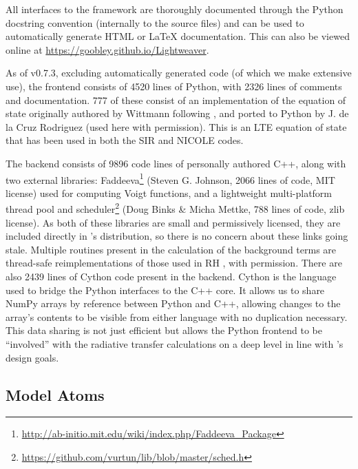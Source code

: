 All interfaces to the framework are thoroughly documented through the Python docstring convention (internally to the source files) and can be used to automatically generate HTML or \LaTeX{} documentation.
This can also be viewed online at \url{https://goobley.github.io/Lightweaver}.

As of v0.7.3, excluding automatically generated code (of which we make extensive use), the \Lw{} frontend consists of 4520 lines of Python, with 2326 lines of comments and documentation.
777 of these consist of an implementation of the equation of state originally authored by Wittmann following \citet{Mihalas1978}, and ported to Python by J. de la Cruz Rodriguez (used here with permission).
This is an LTE equation of state that has been used in both the SIR \citep{1992RuizCobo} and NICOLE \citep{Socas-Navarro2015} codes.

The backend consists of 9896 code lines of personally authored C++, along with two external libraries: Faddeeva\footnote{\url{http://ab-initio.mit.edu/wiki/index.php/Faddeeva_Package}} (Steven G. Johnson, 2066 lines of code, MIT license) used for computing Voigt functions, and a lightweight multi-platform thread pool and scheduler\footnote{\url{https://github.com/vurtun/lib/blob/master/sched.h}} (Doug Binks \& Micha Mettke, 788 lines of code, zlib license).
As both of these libraries are small and permissively licensed, they are included directly in \Lw{}'s distribution, so there is no concern about these links going stale.
Multiple routines present in the calculation of the background terms are thread-safe reimplementations of those used in RH \citep{Uitenbroek2001}, with permission.
There are also 2439 lines of Cython \citep{Behnel2011} code present in the backend.
Cython is the language used to bridge the Python interfaces to the C++ core.
It allows us to share NumPy \citep{Harris2020} arrays by reference between Python and C++, allowing changes to the array's contents to be visible from either language with no duplication necessary.
This data sharing is not just efficient but allows the Python frontend to be ``involved'' with the radiative transfer calculations on a deep level in line with \Lw{}'s design goals.

\subsection{Model Atoms}

